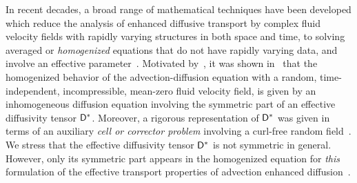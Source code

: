 \documentclass[amsa]{ipart}
\begin{document}
In recent decades, a broad range of mathematical techniques have been
developed
%
%
which reduce the analysis of enhanced diffusive transport by complex
fluid velocity fields with rapidly varying structures in both space
and time, to 
solving averaged or \emph{homogenized} equations that do not have
rapidly varying data, and involve an effective
parameter~\cite{Papanicolaou:1981:36:8,McLaughlin:SIAM_JAM:780,Bensoussan:Book:1978,Biferale:PF:2725,Fannjiang:1994:SIAM_JAM:333,Novikov:2005:CPAM:867,Fannjiang:1997:1033,Mauri:1991:3:743,Pavliotis:PHD_Thesis,Pavliotis:CMS:2007:507,Clark:1998:364,Holmes:1995:94481954,Hornung:1997:9780387947860,Majda:Kramer:1999:book,Majda:1994:10.1088,Xin:2009:Fronts:9780387876832}. Motivated
by~\cite{Papanicolaou:RF-835}, it was
shown in~\cite{McLaughlin:SIAM_JAM:780} that the homogenized behavior of
the advection-diffusion equation with a random, time-independent,
incompressible, mean-zero fluid velocity field, is given by an
inhomogeneous diffusion equation involving the symmetric part
of an effective diffusivity tensor $\mathsf{D}^*$. Moreover, a rigorous
representation of $\mathsf{D}^*$ was given in terms of an auxiliary
\emph{cell or corrector problem} involving a curl-free random
field~\cite{McLaughlin:SIAM_JAM:780}. We stress that the effective
diffusivity tensor $\mathsf{D}^*$ is not symmetric in general. However, only
its symmetric part appears in the homogenized equation for \emph{this} 
formulation of the effective transport properties of advection
enhanced diffusion~\cite{McLaughlin:SIAM_JAM:780}.    
\end{document}
